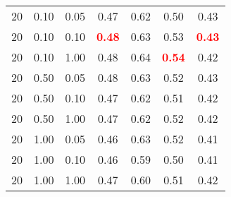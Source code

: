 \begin{tabular}{lllcccc}
20 & 0.10 & 0.05 & 0.47 & 0.62 & 0.50 & 0.43 \\ 
20 & 0.10 & 0.10 & \textbf{\textcolor{red}{0.48}} & 0.63 & 0.53 & \textbf{\textcolor{red}{0.43}} \\ 
20 & 0.10 & 1.00 & 0.48 & 0.64 & \textbf{\textcolor{red}{0.54}} & 0.42 \\ 
20 & 0.50 & 0.05 & 0.48 & 0.63 & 0.52 & 0.43 \\ 
20 & 0.50 & 0.10 & 0.47 & 0.62 & 0.51 & 0.42 \\ 
20 & 0.50 & 1.00 & 0.47 & 0.62 & 0.52 & 0.42 \\ 
20 & 1.00 & 0.05 & 0.46 & 0.63 & 0.52 & 0.41 \\ 
20 & 1.00 & 0.10 & 0.46 & 0.59 & 0.50 & 0.41 \\ 
20 & 1.00 & 1.00 & 0.47 & 0.60 & 0.51 & 0.42 \\ 
\end{tabular} 
